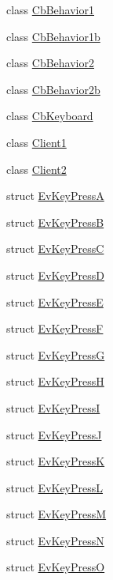\begin{DoxyCompactItemize}
\item 
class \hyperlink{classsm__three__some_1_1CbBehavior1}{Cb\+Behavior1}
\item 
class \hyperlink{classsm__three__some_1_1CbBehavior1b}{Cb\+Behavior1b}
\item 
class \hyperlink{classsm__three__some_1_1CbBehavior2}{Cb\+Behavior2}
\item 
class \hyperlink{classsm__three__some_1_1CbBehavior2b}{Cb\+Behavior2b}
\item 
class \hyperlink{classsm__three__some_1_1CbKeyboard}{Cb\+Keyboard}
\item 
class \hyperlink{classsm__three__some_1_1Client1}{Client1}
\item 
class \hyperlink{classsm__three__some_1_1Client2}{Client2}
\item 
struct \hyperlink{structsm__three__some_1_1EvKeyPressA}{Ev\+Key\+PressA}
\item 
struct \hyperlink{structsm__three__some_1_1EvKeyPressB}{Ev\+Key\+PressB}
\item 
struct \hyperlink{structsm__three__some_1_1EvKeyPressC}{Ev\+Key\+PressC}
\item 
struct \hyperlink{structsm__three__some_1_1EvKeyPressD}{Ev\+Key\+PressD}
\item 
struct \hyperlink{structsm__three__some_1_1EvKeyPressE}{Ev\+Key\+PressE}
\item 
struct \hyperlink{structsm__three__some_1_1EvKeyPressF}{Ev\+Key\+PressF}
\item 
struct \hyperlink{structsm__three__some_1_1EvKeyPressG}{Ev\+Key\+PressG}
\item 
struct \hyperlink{structsm__three__some_1_1EvKeyPressH}{Ev\+Key\+PressH}
\item 
struct \hyperlink{structsm__three__some_1_1EvKeyPressI}{Ev\+Key\+PressI}
\item 
struct \hyperlink{structsm__three__some_1_1EvKeyPressJ}{Ev\+Key\+PressJ}
\item 
struct \hyperlink{structsm__three__some_1_1EvKeyPressK}{Ev\+Key\+PressK}
\item 
struct \hyperlink{structsm__three__some_1_1EvKeyPressL}{Ev\+Key\+PressL}
\item 
struct \hyperlink{structsm__three__some_1_1EvKeyPressM}{Ev\+Key\+PressM}
\item 
struct \hyperlink{structsm__three__some_1_1EvKeyPressN}{Ev\+Key\+PressN}
\item 
struct \hyperlink{structsm__three__some_1_1EvKeyPressO}{Ev\+Key\+PressO}

\end{DoxyCompactItemize}
